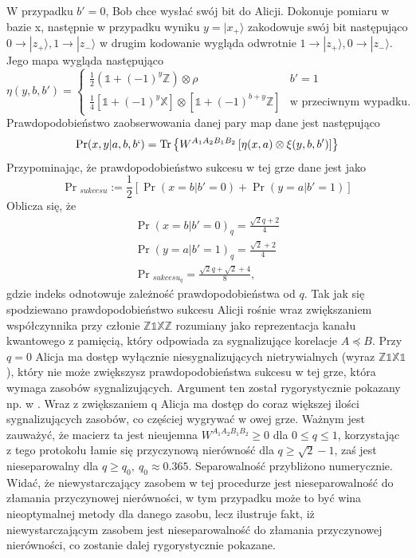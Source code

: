 \documentclass[10pt]{article} %
\DeclareMathOperator{\Trs}{Tr}
\newcommand{\Ket}[1]{|#1\rangle}
\newcommand{\WAll}{W^{A_1A_2B_1B_2}}
\newcommand{\X}{\mathbb{X}}
\newcommand{\Z}{\mathbb{Z}}
\newcommand{\I}{\mathbb{1}}
\begin{document}
W przypadku $b'=0$, Bob chce wysłać swój bit do Alicji. Dokonuje pomiaru w bazie x, następnie w przypadku wyniku $y = \Ket{x_+}$ zakodowuje swój bit następująco $0 \to \Ket{z_+}, 1 \to \Ket{z_-}$ w drugim kodowanie wygląda odwrotnie $1 \to \Ket{z_+}, 0 \to \Ket{z_-}$. Jego mapa wygląda następująco
\begin{equation}
\eta(y, b, b') =
\begin{cases}
\frac{1}{2}\left(
\I + (-1)^y\Z
\right) \otimes \rho&b'=1\\
\frac{1}{4} \left[ \I + (-1)^y \X \right] \otimes \left[ \I + (-1)^{b+y} \Z \right]& \text{w przeciwnym wypadku}.
\end{cases}
\end{equation}
Prawdopodobieństwo zaobserwowania danej pary map dane jest następująco
\begin{equation}
\Pr(x,y|a,b,b`) = \Trs\left\{{\WAll\left[\eta(x,a) \otimes \xi(y,b,b') \right]}\right\}
\end{equation}
Przypominając, że prawdopodobieństwo sukcesu w tej grze dane jest jako
\begin{equation}
\Pr{}_{sukcesu} := \frac{1}{2} \left[ \Pr(x=b|b'=0) + \Pr(y=a|b' = 1)\right]
\end{equation}
Oblicza się, że
\begin{gather}
\Pr(x=b|b'=0)_q = \frac{\sqrt{2}q+2}{4} \\
\Pr(y=a|b'=1)_q = \frac{\sqrt{2}+2}{4} \\ 
\Pr{}_{sukcesu_q} = \frac{\sqrt{2}q + \sqrt{2} + 4}{8},
\end{gather}
gdzie indeks odnotowuje zależność prawdopodobieństwa od $q$. Tak jak się spodziewano prawdopodobieństwo sukcesu Alicji rośnie wraz zwiększaniem współczynnika przy członie $\Z\I\X\Z$ rozumiany jako reprezentacja kanału kwantowego z pamięcią, który odpowiada za sygnalizujące korelacje $A \preceq B$.
Przy $q = 0$ Alicja ma dostęp wyłącznie niesygnalizujących nietrywialnych (wyraz $\Z\I\X\I$), który nie może zwiększysz prawdopodobieństwa sukcesu w tej grze, która wymaga zasobów sygnalizujących. Argument ten został rygorystycznie pokazany np. w \cite{mp_gyni}. Wraz z zwiększaniem q Alicja ma dostęp do coraz
większej ilości sygnalizujących zasobów, co częściej wygrywać w owej grze. Ważnym jest zauważyć, że macierz ta jest nieujemna $\WAll \geq 0$ dla $0 \leq q \leq 1$, korzystając z tego protokołu łamie się przyczynową nierówność dla $q \geq \sqrt{2} - 1$, zaś jest nieseparowalny dla $q \geq q_0,~q_0 \approx 0.365$.
Separowalność przybliżono numerycznie. Widać, że niewystarczający zasobem w tej procedurze jest nieseparowalność do złamania przyczynowej nierówności, w tym przypadku może to być wina nieoptymalnej metody dla danego zasobu, lecz ilustruje fakt, iż niewystarczającym zasobem jest nieseparowalność do
złamania przyczynowej nierówności, co zostanie dalej rygorystycznie pokazane.
\end{document}
